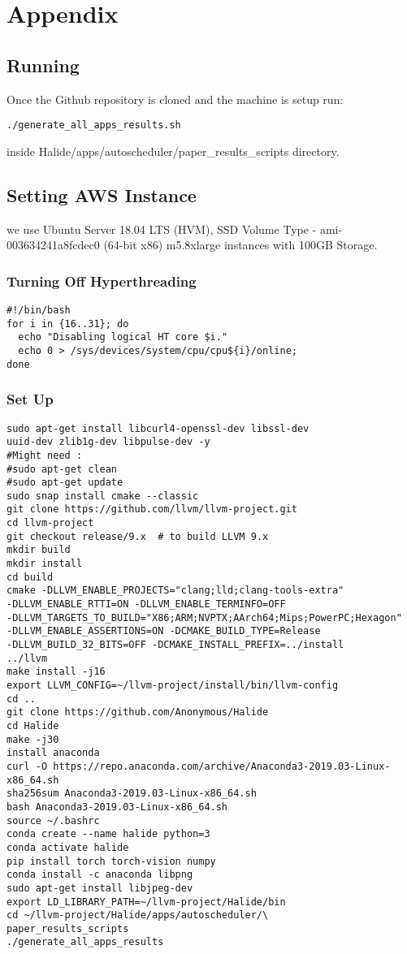 \section*{Appendix}
\subsection{Running}
Once the Github repository is cloned and the machine is setup run:
\begin{verbatim}
./generate_all_apps_results.sh
\end{verbatim}
inside Halide/apps/autoscheduler/paper\_results\_scripts directory.
\subsection{Setting AWS Instance}
we use Ubuntu Server 18.04 LTS (HVM), SSD Volume Type - ami-003634241a8fcdec0 (64-bit x86)  m5.8xlarge instances with 100GB Storage.
\subsubsection{Turning Off Hyperthreading}

\begin{verbatim}
#!/bin/bash
for i in {16..31}; do
  echo "Disabling logical HT core $i."
  echo 0 > /sys/devices/system/cpu/cpu${i}/online;
done
\end{verbatim}
\subsubsection{Set Up}
\begin{verbatim}
sudo apt-get install libcurl4-openssl-dev libssl-dev
uuid-dev zlib1g-dev libpulse-dev -y
#Might need :
#sudo apt-get clean
#sudo apt-get update
sudo snap install cmake --classic
git clone https://github.com/llvm/llvm-project.git
cd llvm-project
git checkout release/9.x  # to build LLVM 9.x
mkdir build
mkdir install
cd build
cmake -DLLVM_ENABLE_PROJECTS="clang;lld;clang-tools-extra" 
-DLLVM_ENABLE_RTTI=ON -DLLVM_ENABLE_TERMINFO=OFF
-DLLVM_TARGETS_TO_BUILD="X86;ARM;NVPTX;AArch64;Mips;PowerPC;Hexagon" 
-DLLVM_ENABLE_ASSERTIONS=ON -DCMAKE_BUILD_TYPE=Release
-DLLVM_BUILD_32_BITS=OFF -DCMAKE_INSTALL_PREFIX=../install 
../llvm
make install -j16
export LLVM_CONFIG=~/llvm-project/install/bin/llvm-config
cd ..
git clone https://github.com/Anonymous/Halide
cd Halide
make -j30
install anaconda
curl -O https://repo.anaconda.com/archive/Anaconda3-2019.03-Linux-x86_64.sh
sha256sum Anaconda3-2019.03-Linux-x86_64.sh
bash Anaconda3-2019.03-Linux-x86_64.sh
source ~/.bashrc
conda create --name halide python=3
conda activate halide
pip install torch torch-vision numpy
conda install -c anaconda libpng
sudo apt-get install libjpeg-dev
export LD_LIBRARY_PATH=~/llvm-project/Halide/bin
cd ~/llvm-project/Halide/apps/autoscheduler/\
paper_results_scripts
./generate_all_apps_results
\end{verbatim}


